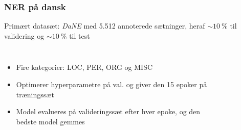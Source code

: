 \documentclass{beamer}
\newcommand{\unit}[1]{\ensuremath{\:\text{#1}}}
\newcommand{\pro}{\ensuremath{\unit{\%{}}}}
\begin{document}
\begin{frame}
    \frametitle{NER på dansk}
    Primært datasæt: \emph{DaNE} med 5.512 annoterede sætninger, heraf $ \sim 10\pro $ til validering og $ \sim 10\pro $ til test
    \begin{columns}
        \begin{itemize}
            \item Fire kategorier: LOC, PER, ORG og MISC
            \item Optimerer hyperparametre på val. og giver den 15 epoker på træningssæt
            \item Model evalueres på valideringssæt efter hver epoke, og den bedste model gemmes
        \end{itemize}
        \begin{figure}[H]
            \centering
            \begin{overlayarea}{\textwidth}{4cm}
            \end{overlayarea}
        \end{figure}
    \end{columns}
\end{frame}
\end{document}
